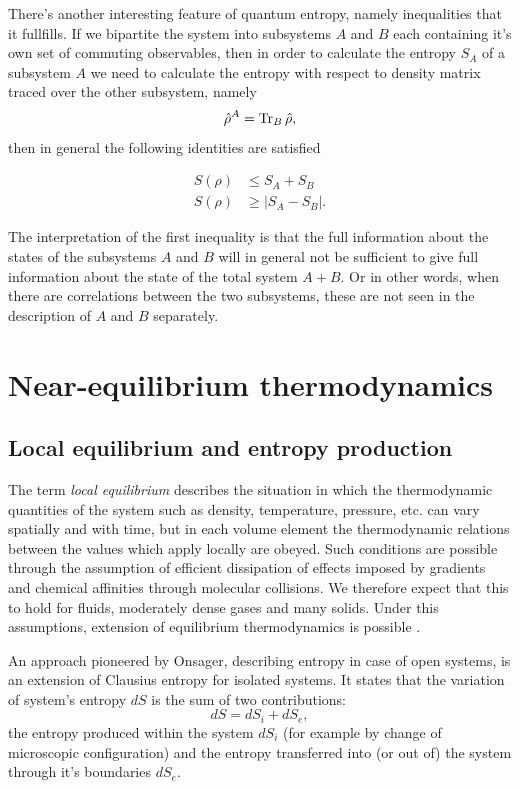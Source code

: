 \documentclass[a4paper,12pt]{article}
\begin{document}
There's another interesting feature of quantum entropy, namely inequalities that it fullfills.
If we bipartite the system into subsystems $A$ and $B$ each containing it's own set of commuting observables, then in order to calculate the entropy $S_A$ of a subsystem $A$ we need to calculate the entropy with respect to density matrix traced over the other subsystem, namely
\begin{equation}
  \hat{\rho}^A = \Tr_B \hat{\rho},
\end{equation}
then in general the following identities are satisfied

\begin{equation}
\begin{aligned}
	S(\rho) &\leq S_A + S_B	\\
	S(\rho) &\geq \left| S_A - S_B \right|.
\end{aligned}
\end{equation}

The interpretation of the first inequality is that the full information about the states of the subsystems $A$ and $B$ will in general not be sufficient to give full information about the state of the total system $A+B$. Or in other words, when there are correlations between the two subsystems, these are not seen in the description of $A$ and $B$ separately. 

\section{Near-equilibrium thermodynamics}
\label{NearEquilibrium}
\subsection{Local equilibrium and entropy production}

The term \textit{local equilibrium} describes the situation in which the thermodynamic quantities of the system such as density, temperature, pressure, etc. can vary spatially and with time, but in each volume element the thermodynamic relations between the values which apply locally are obeyed. 
Such conditions are possible through the assumption of efficient dissipation of effects imposed by gradients and chemical affinities through molecular collisions. We therefore expect that this to hold for fluids, moderately dense gases and many solids.
Under this assumptions, extension of equilibrium thermodynamics is possible \cite{Anonymous:NJxQY1gt}.

An approach pioneered by Onsager, describing entropy in case of open systems, is an extension of Clausius entropy for isolated systems. It states that the variation of system's entropy $dS$ is the sum of two contributions: 
\begin{equation}
\label{OpenSystemEntropy}
  	dS=dS_i+dS_e,
\end{equation}
the entropy produced within the system $dS_i$ (for example by change of microscopic configuration) and the entropy transferred into (or out of) the system through it's boundaries $dS_e$.
\end{document}
